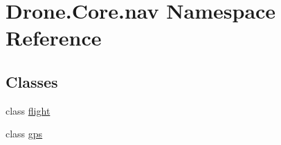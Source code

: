 \hypertarget{namespace_drone_1_1_core_1_1nav}{}\section{Drone.\+Core.\+nav Namespace Reference}
\label{namespace_drone_1_1_core_1_1nav}
\subsection*{Classes}
\begin{DoxyCompactItemize}
\item 
class \hyperlink{class_drone_1_1_core_1_1nav_1_1flight}{flight}
\item 
class \hyperlink{class_drone_1_1_core_1_1nav_1_1gps}{gps}
\end{DoxyCompactItemize}
